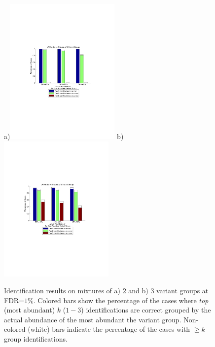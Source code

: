 %
%
\begin{figure}[htbp]
\centering %
a)\includegraphics[trim = 30mm 80mm 40mm 80mm,clip, width=0.5\textwidth]{fig/simulation/topkcorrect_2variants_byQ.pdf}
b)\includegraphics[trim = 30mm 80mm 40mm 80mm,clip, width=0.5\textwidth]{fig/simulation/topkcorrect_3variants_byQ.pdf}
\caption[Identification results on mixtures of $2$ and $3$ variant groups]{Identification results on mixtures of a) $2$ and b) $3$ variant groups at FDR=$1\%$. Colored bars show the percentage of the cases where \emph{top} (most abundant) $k$ ($1-3$) identifications are correct grouped by the actual abundance of the most abundant the variant group. Non-colored (white) bars indicate the percentage of the cases with $\geq k$ group identifications.}
\label{fig:SimTopkCorrect_byQ}
\end{figure}

